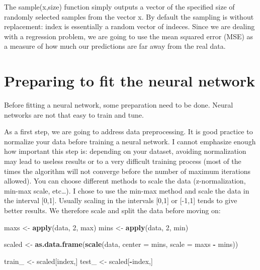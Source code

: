 \documentclass[]{book}
\newenvironment{Shaded}{\begin{snugshade}}{\end{snugshade}}
\newcommand{\DataTypeTok}[1]{\textcolor[rgb]{0.13,0.29,0.53}{#1}}
\newcommand{\DecValTok}[1]{\textcolor[rgb]{0.00,0.00,0.81}{#1}}
\newcommand{\KeywordTok}[1]{\textcolor[rgb]{0.13,0.29,0.53}{\textbf{#1}}}
\newcommand{\NormalTok}[1]{#1}
\newcommand{\OperatorTok}[1]{\textcolor[rgb]{0.81,0.36,0.00}{\textbf{#1}}}
\newcommand{\StringTok}[1]{\textcolor[rgb]{0.31,0.60,0.02}{#1}}
\begin{document}
The sample(x,size) function simply outputs a vector of the specified size of randomly selected samples from the vector x. By default the sampling is without replacement: index is essentially a random vector of indeces.
Since we are dealing with a regression problem, we are going to use the mean squared error (MSE) as a measure of how much our predictions are far away from the real data.

\hypertarget{preparing-to-fit-the-neural-network}{%
\section{Preparing to fit the neural network}\label{preparing-to-fit-the-neural-network}}

Before fitting a neural network, some preparation need to be done. Neural networks are not that easy to train and tune.

As a first step, we are going to address data preprocessing.
It is good practice to normalize your data before training a neural network. I cannot emphasize enough how important this step is: depending on your dataset, avoiding normalization may lead to useless results or to a very difficult training process (most of the times the algorithm will not converge before the number of maximum iterations allowed). You can choose different methods to scale the data (z-normalization, min-max scale, etc\ldots{}). I chose to use the min-max method and scale the data in the interval {[}0,1{]}. Usually scaling in the intervals {[}0,1{]} or {[}-1,1{]} tends to give better results.
We therefore scale and split the data before moving on:

\begin{Shaded}
\begin{Highlighting}[]
\NormalTok{maxs <-}\StringTok{ }\KeywordTok{apply}\NormalTok{(data, }\DecValTok{2}\NormalTok{, max) }
\NormalTok{mins <-}\StringTok{ }\KeywordTok{apply}\NormalTok{(data, }\DecValTok{2}\NormalTok{, min)}

\NormalTok{scaled <-}\StringTok{ }\KeywordTok{as.data.frame}\NormalTok{(}\KeywordTok{scale}\NormalTok{(data, }\DataTypeTok{center =}\NormalTok{ mins, }\DataTypeTok{scale =}\NormalTok{ maxs }\OperatorTok{-}\StringTok{ }\NormalTok{mins))}

\NormalTok{train_ <-}\StringTok{ }\NormalTok{scaled[index,]}
\NormalTok{test_ <-}\StringTok{ }\NormalTok{scaled[}\OperatorTok{-}\NormalTok{index,]}
\end{Highlighting}
\end{Shaded}
\end{document}
